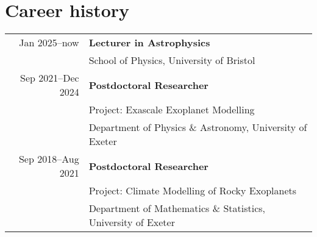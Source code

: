 \documentclass[a4paper, 11pt]{article}
\begin{document}
\thispagestyle{empty}

\keepXColumns





\section{Career history}
\begin{tabularx}{\linewidth}{@{}r X@{}}
Jan 2025--now  & \textbf{Lecturer in Astrophysics}\\
& School of Physics, University of Bristol \\
Sep 2021--Dec 2024 & \textbf{Postdoctoral Researcher}\\
& Project: Exascale Exoplanet Modelling\\
& Department of Physics \& Astronomy, University of Exeter \\
Sep 2018--Aug 2021 & \textbf{Postdoctoral Researcher} \\
& Project: Climate Modelling of Rocky Exoplanets\\
& Department of Mathematics \& Statistics, University of Exeter
\end{tabularx}

\vspace{-10pt}
\end{document}
